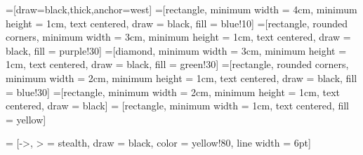 \documentclass{article}
\begin{document}
	
\thispagestyle{empty} %

=[draw=black,thick,anchor=west]
=[rectangle, minimum width = 4cm, minimum height = 1cm, text centered, draw = black, fill = blue!10]
=[rectangle, rounded corners, minimum width = 3cm, minimum height = 1cm, text centered, draw = black, fill = purple!30]
=[diamond, minimum width = 3cm, minimum height = 1cm, text centered, draw = black, fill = green!30]
=[rectangle, rounded corners, minimum width = 2cm, minimum height = 1cm, text centered, draw = black, fill = blue!30]
=[rectangle, minimum width = 2cm, minimum height = 1cm, text centered, draw = black]
 = [rectangle, minimum width = 1cm, text centered, fill = yellow]

 = [->, > = stealth, draw = black, color = yellow!80, line width = 6pt]
\iffalse
\tikzset{
	darrow/.style args={#1 colored by #2 and #3}{
		-stealth,line width=#1,#2, %
		postaction={draw,-stealth,#3,line width=(#1)/3,
			shorten <=(#1)/3,shorten >=2*(#1)/3}, %
	}
}
\fi
\end{document}
